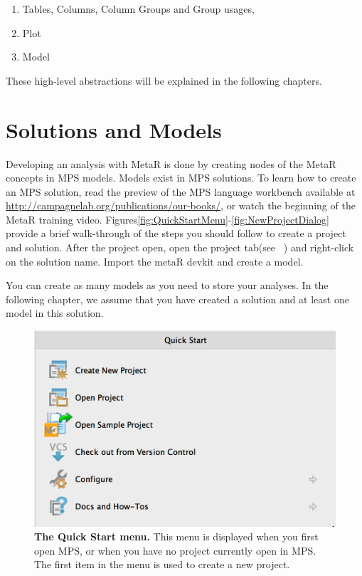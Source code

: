 \begin{enumerate}
	\item Tables, Columns, Column Groups and Group usages,
	\item Plot
	\item Model
\end{enumerate}

\noindent{}These high-level abstractions will be explained in the following chapters.

\section{Solutions and Models}
Developing an analysis with MetaR is done by creating nodes of the MetaR concepts in MPS models. Models exist in MPS solutions. To learn how to create an MPS solution, read the preview of the MPS language workbench available at \url{http://campagnelab.org/publications/our-books/}\cite{campagne2014mps}, or watch the beginning of the MetaR training video. Figures\ref{fig:QuickStartMenu}-\ref{fig:NewProjectDialog} provide a brief walk-through of the steps you should follow to create a project and solution. After the project open, open the project tab(see ~\cite{campagne2014mps}) and right-click on the solution name. Import the metaR devkit and create a model. 

You can create as many models as you need to store your analyses. In the following chapter, we assume that you have created a solution and at least one model in this solution. 


\begin{figure}
  \includegraphics[width=\figWidthNarrow]{figures/QuickStart.png}
  \caption[The Quick Start menu.]{\textbf{The Quick Start menu.} This menu is displayed when you first open MPS, or when you have no project currently open in MPS. The first item in the menu is used to create a new project. 
}
\end{figure}\label{fig:QuickStartMenu}


